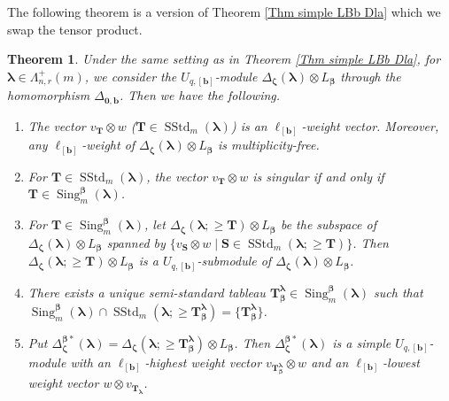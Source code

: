 \documentclass[12pt]{amsart}
\newtheorem{thm}{Theorem}[section]
\numberwithin{equation}{thm}
\newcommand\bS{\mathbf S}
\newcommand\bT{\mathbf T}
\newcommand\bb{\mathbf b}
\newcommand\D{\Delta}
\newcommand\vL{\varLambda}
\newcommand\Bb{\boldsymbol\beta}
\newcommand\Bz{\boldsymbol\zeta}
\newcommand\Bla{\boldsymbol\lambda}
\newcommand{\SStd}{\operatorname{SStd}}
\newcommand{\Sing}{\operatorname{Sing}}
\newcounter{ni}
\begin{document}
The following theorem is a version of Theorem \ref{Thm simple LBb Dla} which we swap the tensor product. 

\begin{thm}
\label{Thm D Bla otimes LBb}
Under the same setting as in Theorem \ref{Thm simple LBb Dla}, 
for $\Bla \in \vL_{n,r}^+(m)$, 
we consider the $U_{q,[\bb]}$-module 
$\D_{\Bz} (\Bla) \otimes L_{\Bb} $
through the homomorphism $\D_{\mathbf{0}, \bb}$. 
Then we have the following. 
\begin{enumerate}
\item 
The vector $v_{\bT} \otimes w$ ($\bT \in \SStd_m(\Bla)$) is an $\ell_{[\bb]}$-weight vector. 
Moreover, any $\ell_{[\bb]}$-weight of $\D_{\Bz} (\Bla) \otimes L_{\Bb} $ is multiplicity-free. 

\item 
For $\bT \in \SStd_m (\Bla)$, 
the vector $ v_{\bT} \otimes w$ is singular 
if and only if 
$\bT \in \Sing_m^{\Bb} (\Bla)$. 

\item 
For $\bT \in \Sing_m^{\Bb} (\Bla)$, 
let $\D_{\Bz}(\Bla ; \geq \bT) \otimes L_{\Bb} $  be the subspace of $\D_{\Bz}(\Bla) \otimes L_{\Bb} $ 
spanned by $\{  v_{\bS} \otimes w \mid \bS \in \SStd_m (\Bla ; \geq \bT) \}$. 
Then $\D_{\Bz} (\Bla ; \geq \bT) \otimes L_{\Bb} $ is a $U_{q,[\bb]}$-submodule of $\D_{\Bz} (\Bla) \otimes L_{\Bb} $. 

\item 
There exists a unique semi-standard tableau $\bT^{\Bla}_{\Bb}  \in \Sing_m^{\Bb} (\Bla)$ 
such that \break 
$\Sing_m^{\Bb} (\Bla) \cap \SStd_m (\Bla ; \geq \bT^{\Bla}_{\Bb}) = \{ \bT^{\Bla}_{\Bb} \}$. 

\item 
Put $\D_{\Bz}^{\Bb*} (\Bla) = \D_{\Bz}(\Bla ; \geq \bT^{\Bla}_{\Bb}) \otimes L_{\Bb} $. 
Then $\D_{\Bz}^{\Bb *} (\Bla)$ is a simple $U_{q,[\bb]}$-module with 
an $\ell_{[\bb]}$-highest weight vector $ v_{\bT^{\Bla}_{\Bb}} \otimes w$ 
and an $\ell_{[\bb]}$-lowest weight vector $w \otimes v_{\bT_{\Bla}}$. 


\end{enumerate}
\end{thm}
\end{document}
